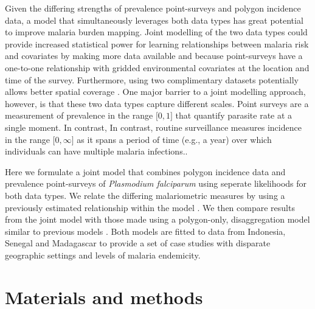 \documentclass[10pt,letterpaper]{article}
\begin{document}
Given the differing strengths of prevalence point-surveys and polygon incidence data, a model that simultaneously leverages both data types has great potential to improve malaria burden mapping.
Joint modelling of the two data types could provide increased statistical power for learning relationships between malaria risk and covariates by making more data available and because point-surveys have a one-to-one relationship with gridded environmental covariates at the location and time of the survey.
Furthermore, using two complimentary datasets potentially allows better spatial coverage \cite{sturrock2016mapping}. 
One major barrier to a joint modelling approach, however, is that these two data types capture different scales.
Point surveys are a measurement of prevalence in the range $\lbrack 0, 1\rbrack$ that quantify parasite rate at a single moment. In contrast,
In contrast, routine surveillance measures incidence in the range $\lbrack 0, \infty\rbrack$ as it spans a period of time (e.g., a year) over which individuals can have multiple malaria infections..


Here we formulate a joint model that combines polygon incidence data and prevalence point-surveys of \emph{Plasmodium falciparum} using seperate likelihoods for both data types.
We relate the differing malariometric measures by using a previously estimated relationship within the model \cite{cameron2015defining}.
We then compare results from the joint model with those made using a polygon-only, disaggregation model similar to previous models \cite{sturrock2014fine, wilson2017pointless}.
Both models are fitted to data from Indonesia, Senegal and Madagascar to provide a set of case studies with disparate geographic settings and levels of malaria endemicity.





\section*{Materials and methods}
\end{document}
